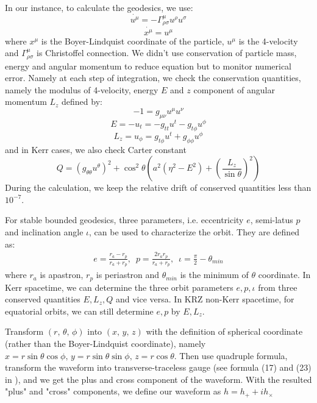 \documentclass{article}
\begin{document}
In our instance, to calculate the geodesics, we use:
\begin{equation}
	\dot{u^\mu}=-\Gamma^\mu_{\rho\sigma}u^\rho u^\sigma
\end{equation}
\begin{equation}
	\dot{x^\mu}=u^\mu 
\end{equation}
where $x^\mu$ is the Boyer-Lindquist coordinate of the particle, $u^\mu$ is the 4-velocity and $\Gamma^\mu_{\rho\sigma}$ is Christoffel connection. We didn't use conservation of particle mass, energy and angular momentum to reduce equation but to monitor numerical error. Namely at each step of integration, we check the conservation quantities, namely the modulus of 4-velocity, energy $E$ and $z$ component of angular momentum $L_z$ defined by:
\begin{equation}
	-1 = g_{\mu\nu} u^\mu u^\nu
\end{equation}
\begin{equation}
	E = -u_t = - g_{tt} u^t -g_{t\phi} u^\phi
\end{equation}
\begin{equation}
	L_z = u_\phi = g_{t\phi } u^t + g_{\phi\phi} u^\phi
\end{equation}
 and in Kerr cases, we also check Carter constant
 \begin{equation}
 	Q = (g_{\theta\theta} u^\theta)^2 + \cos ^2 \theta (a^2 (\eta^2-E^2) + (\frac{L_z}{\sin \theta})^2 )
 \end{equation}
During the calculation, we keep the relative drift of conserved quantities less than $10^{-7}$.

For stable bounded geodesics, three parameters, i.e. eccentricity $e$, semi-latus $p$ and inclination angle $\iota$, can be used to characterize the orbit. They are defined as:
\begin{equation}
\begin{aligned}
e=\frac{r_a-r_p}{r_a+r_p},\,\,\, p=\frac{2r_a r_p}{r_a+r_p},\,\,\, \iota=\frac \pi 2 -\theta_{min}
\end{aligned}
\end{equation} 
where $r_a$ is apastron, $r_p$ is periastron and $\theta_{min}$ is the minimum of $\theta$ coordinate. In Kerr spacetime, we can determine the three orbit parameters $e,p,\iota$ from three conserved quantities $E,L_z,Q$ and vice versa. In KRZ non-Kerr spacetime, for equatorial orbits, we can still determine $e,p$ by $E,L_z$.

Transform $(r,\,\theta,\,\phi)$ into $(x,\,y,\,z)$ with the definition of spherical coordinate (rather than the Boyer-Lindquist coordinate), namely $x=r\sin\theta \cos \phi,\, y=r\sin\theta\sin\phi,\, z=r\cos\theta$. Then use quadruple formula, %
%
transform the waveform into transverse-traceless gauge (see formula (17) and (23) in \cite{kludge}), and we get the plus and cross component of the waveform. With the resulted "plus" and "cross" components, we define our waveform as $h = h_+ + i h_\times$
\end{document}
